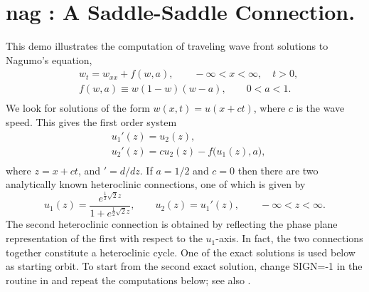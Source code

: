 \documentclass[12pt]{report}
\begin{document}
\newpage
\section{ nag : A Saddle-Saddle Connection.} \label{sec:Demos_nag}
This demo illustrates the computation of traveling wave front solutions
to Nagumo's equation,
\begin{equation} \begin{array}{cl}
  & w_t = w_{xx} + f(w,a),
  \qquad -\infty < x < \infty,
  \quad  t > 0,  \\
  & f(w,a) \equiv w(1-w)(w-a), \qquad 0<a<1.  \\
\end{array} \end{equation}
We look for solutions of the form $w(x,t)=u(x+ct)$, where
$c$ is the wave speed.
This gives the first order system
\begin{equation} \begin{array}{cl}
  &  u_1'(z)  = u_2(z),  \\
  &  u_2'(z)  = c u_2(z) - f\bigl(u_1(z),a\bigr),  \\
\end{array} \end{equation}
where $z=x+ct$, and $' = d/dz$.
If $a=1/2$ and $c=0$ then there are two analytically known
heteroclinic connections, one of which is given by
$$ u_1(z) = \frac{
  {e^{\frac{1}{2} \sqrt{2} z}}
  }{
  {1 + e^{\frac{1 }{ 2} \sqrt{2} z}}  },
  \qquad  u_2(z) = u_1'(z),  \qquad  -\infty < z < \infty.
  $$
The second heteroclinic connection is obtained by reflecting the
phase plane representation of the first with respect to the
$u_1$-axis.
In fact, the two connections together constitute a heteroclinic cycle.
One of the exact solutions is used below as starting orbit.
To start from the second exact solution, change SIGN=-1 in the  
routine  in  and repeat the computations below;
see also
 \citeyear{FrDo:91}.
\end{document}

